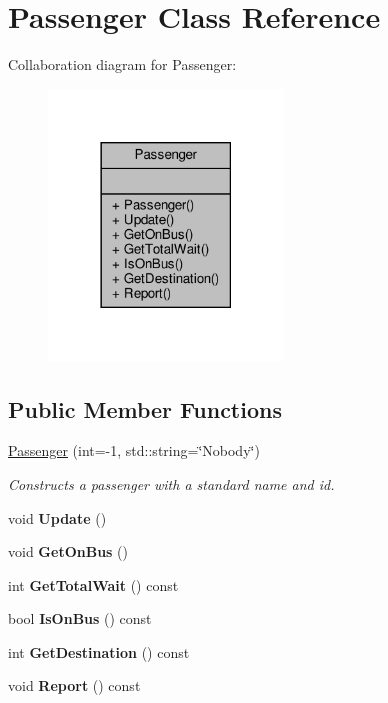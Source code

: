 \hypertarget{classPassenger}{}\section{Passenger Class Reference}
\label{classPassenger}


Collaboration diagram for Passenger\+:
\nopagebreak
\begin{figure}[H]
\begin{center}
\leavevmode
\includegraphics[width=177pt]{classPassenger__coll__graph}
\end{center}
\end{figure}
\subsection*{Public Member Functions}
\begin{DoxyCompactItemize}
\item 
\hyperlink{classPassenger_a5c3addb9a6fd03e5e5642ed844e2702c}{Passenger} (int=-\/1, std\+::string=\char`\"{}Nobody\char`\"{})
\begin{DoxyCompactList}\small\item\em Constructs a passenger with a standard name and id. \end{DoxyCompactList}\item 
\mbox{\label{classPassenger_a960de3b29fc17a2c2d79c0b79d5cf299}} 
void {\bfseries Update} ()
\item 
\mbox{\label{classPassenger_ae2ba639cfef39781ac079778578bd9fe}} 
void {\bfseries Get\+On\+Bus} ()
\item 
\mbox{\label{classPassenger_a25158560f790ef7ef06d94c414b34f25}} 
int {\bfseries Get\+Total\+Wait} () const
\item 
\mbox{\label{classPassenger_a2acf008ec444afcc859b914ee24add0e}} 
bool {\bfseries Is\+On\+Bus} () const
\item 
\mbox{\label{classPassenger_a49db0ee527377aae6077df190a11501c}} 
int {\bfseries Get\+Destination} () const
\item 
\mbox{\label{classPassenger_ac54ce797e412a4895febe10f07dc5df5}} 
void {\bfseries Report} () const
\end{DoxyCompactItemize}


